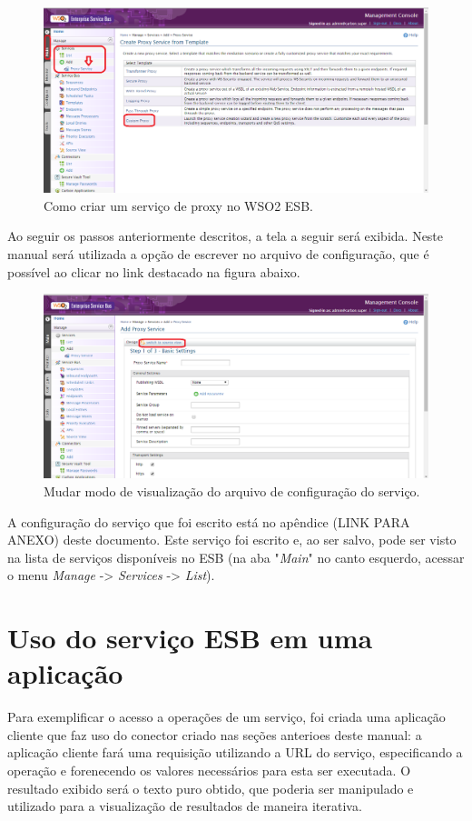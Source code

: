 \begin{figure}[htb]
\centering
\includegraphics[width=1.0\textwidth]{figuras/criar_servico.PNG}
\caption{Como criar um serviço de proxy no WSO2 ESB.}
\label{criar_servico}
\end{figure}

Ao seguir os passos anteriormente descritos, a tela a seguir será exibida. Neste manual será utilizada a opção de escrever no arquivo de configuração, que é possível ao clicar no link destacado na figura abaixo.

\begin{figure}[htb]
\centering
\includegraphics[width=1.0\textwidth]{figuras/switch_view.PNG}
\caption{Mudar modo de visualização do arquivo de configuração do serviço.}
\label{switch_view}
\end{figure}

A configuração do serviço que foi escrito está no apêndice (LINK PARA ANEXO) deste documento. Este serviço foi escrito e, ao ser salvo, pode ser visto na lista de serviços disponíveis no ESB (na aba "\textit{Main}"  no canto esquerdo, acessar o menu \textit{Manage} -> \textit{Services} -> \textit{List}).

\section{Uso do serviço ESB em uma aplicação}
Para exemplificar o acesso a operações de um serviço, foi criada uma aplicação cliente que faz uso do conector criado nas seções anterioes deste manual: a aplicação cliente fará uma requisição utilizando a URL do serviço, especificando a operação e forenecendo os valores necessários para esta ser executada. O resultado exibido será o texto puro obtido, que poderia ser manipulado e utilizado para a visualização de resultados de maneira iterativa. 

